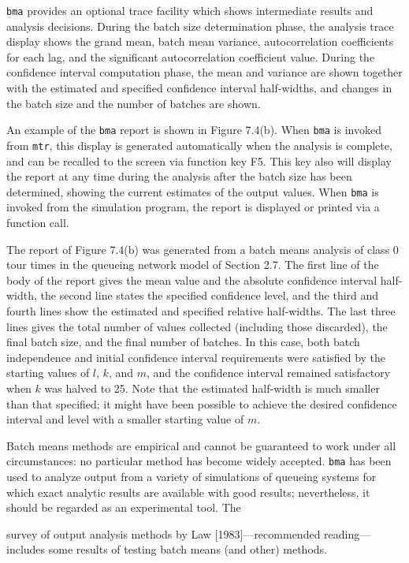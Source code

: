 \texttt{bma} provides an optional trace facility which shows intermediate
results and analysis decisions. During the batch size determination phase,
the analysis trace display shows the grand mean, batch mean variance,
autocorrelation coefficients for each lag, and the significant autocorrelation
coefficient value. During the confidence interval computation phase, the
mean and variance are shown together with the estimated and specified
confidence interval half-widths, and changes in the batch size and the
number of batches are shown.

An example of the \texttt{bma} report is shown in Figure 7.4(b). When \texttt{bma} is
invoked from \texttt{mtr}, this display is generated automatically when the analysis
is complete, and can be recalled to the screen via function key F5. This
key also will display the report at any time during the analysis after the
batch size has been determined, showing the current estimates of the output
values. When \texttt{bma} is invoked from the simulation program, the report is
displayed or printed via a function call.

The report of Figure 7.4(b) was generated from a batch means analysis of
class 0 tour times in the queueing network model of Section 2.7. The first line
of the body of the report gives the mean value and the absolute confidence
interval half-width, the second line states the specified confidence level,
and the third and fourth lines show the estimated and specified relative
half-widths. The last three lines gives the total number of values collected
(including those discarded), the final batch size, and the final number of
batches. In this case, both batch independence and initial confidence interval
requirements were satisfied by the starting values of $l$, $k$, and $m$, and the
confidence interval remained satisfactory when $k$ was halved to 25. Note
that the estimated half-width is much smaller than that specified; it
might have been possible to achieve the desired confidence interval and
level with a smaller starting value of $m$.

Batch means methods are empirical and cannot be guaranteed to work
under all circumstances: no particular method has become widely accepted.
\texttt{bma} has been used to analyze output from a variety of simulations of
queueing systems for which exact analytic results are available with good
results; nevertheless, it should be regarded as an experimental tool. The


\noindent survey of output analysis methods by Law [1983]---recommended reading---
includes some results of testing batch means (and other) methods.

